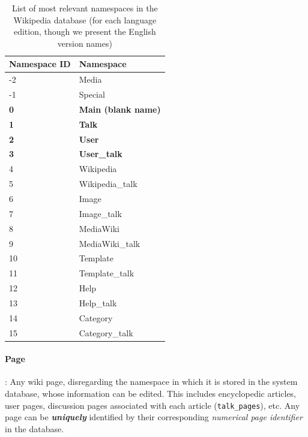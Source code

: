 \begin{center}
   \begin{longtable}{|l|l|}
   \caption{List of most relevant namespaces in the Wikipedia 
    database (for each language edition, though we present the English version names)}
   \label{tab:wkp-namespaces}\\
   \hline
    {\bfseries Namespace ID} & {\bfseries Namespace}\\
   \hline
    -2 & Media\\
    \hline
    -1 & Special\\
    \hline
    {\bfseries 0} & {\bfseries Main (blank name)}\\
    \hline
    {\bfseries 1} & {\bfseries Talk} \\
    \hline
    {\bfseries 2} & {\bfseries User}\\
    \hline
    {\bfseries 3} & {\bfseries User\_talk}\\
    \hline
    4 & Wikipedia\\
    \hline
    5 & Wikipedia\_talk\\
    \hline
    6 & Image\\
    \hline
    7 & Image\_talk\\
    \hline
    8 & MediaWiki\\
    \hline
    9 & MediaWiki\_talk\\
    \hline
    10 & Template\\
    \hline
    11 & Template\_talk\\
    \hline
    12 & Help\\
    \hline
    13 & Help\_talk\\
    \hline
    14 & Category\\
    \hline
    15 & Category\_talk\\
    \hline
    
   \end{longtable}
  \end{center}

\paragraph{Page}: Any wiki page, disregarding the namespace in which it is stored in the
system database, whose information can be edited. This includes
encyclopedic articles, user pages, discussion pages associated with each article 
(\texttt{talk\_pages}), etc. Any page can be \textbf{\textit{uniquely}} identified by their
corresponding \textit{numerical page identifier} in the database.

